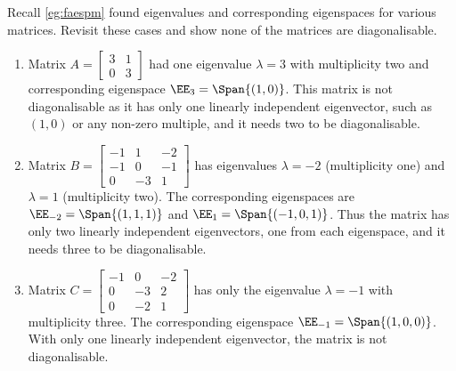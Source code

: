 \begin{example} \label{eg:faespmp}
Recall \autoref{eg:faespm} found eigenvalues and corresponding eigenspaces for various matrices.
Revisit these cases and show none of the matrices are diagonalisable.
\begin{enumerate}
\item Matrix \(A=\begin{bmatrix} 3&1\\0&3 \end{bmatrix}\) had one eigenvalue \(\lambda=3\) with multiplicity two and corresponding eigenspace \(\EE_3=\Span\{(1,0)\}\).
This matrix is not diagonalisable as it has only one linearly independent eigenvector, such as~\((1,0)\) or any non-zero multiple, and it needs two to be diagonalisable. 

\item Matrix \(B=\begin{bmatrix}-1&1&-2
\\-1&0&-1
\\0&-3&1 \end{bmatrix}\)
has eigenvalues  \(\lambda=-2\) (multiplicity one) and \(\lambda=1\) (multiplicity two).
The corresponding eigenspaces are \(\EE_{-2}=\Span\{(1,1,1)\}\) and \(\EE_{1}=\Span\{(-1,0,1)\}\).
Thus the matrix has only two linearly independent eigenvectors, one from each eigenspace, and it needs three to be diagonalisable.

\item Matrix \(C=\begin{bmatrix}-1&0&-2
\\0&-3&2
\\0&-2&1\end{bmatrix}\)
has only the eigenvalue \(\lambda=-1\) with multiplicity three.
The corresponding eigenspace \(\EE_{-1}=\Span\{(1,0,0)\}\).
With only one linearly independent eigenvector, the matrix is not diagonalisable.

\end{enumerate}
\end{example}


